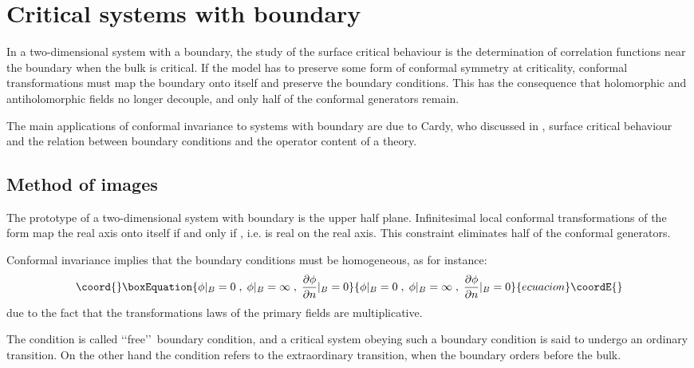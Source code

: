 \documentclass[a4paper,12pt]{report}
\begin{document}
\chapter{Critical systems with boundary}

In a two-dimensional system with a boundary, the study of the surface critical behaviour is the determination of
correlation functions near the boundary when the bulk is critical. If the model has to preserve some form of
conformal symmetry at criticality, conformal transformations must map the boundary onto itself and preserve the
boundary conditions. This has the consequence that holomorphic and antiholomorphic fields no longer decouple, and
only half of the conformal generators remain.

The main applications of conformal invariance to systems with boundary are due to Cardy, who discussed in
\cite{cardy0},\cite{cardy1} surface critical behaviour and the relation between boundary conditions and the
operator content of a theory.

\vspace{1cm}

\section{Method of images}

The prototype of a two-dimensional system with boundary is the upper half plane. Infinitesimal local conformal
transformations of the form \coordHE{} map the real axis onto itself if and only if \coordHE{}, i.e. \myHighlight{$\epsilon$}\coordHE{} is real on the real axis. This constraint eliminates half of the
conformal generators.

Conformal invariance implies that the boundary conditions must be homogeneous, as for instance:
\begin{equation}\coord{}\boxEquation{
\phi|_{B}=0 \; , \;\phi|_{B}=\infty \; , \;\frac{\partial\phi}{\partial n}|_{B}=0
}{
\phi|_{B}=0 \; , \;\phi|_{B}=\infty \; , \;\frac{\partial\phi}{\partial n}|_{B}=0
}{ecuacion}\coordE{}\end{equation}
due to the fact that the transformations laws of the primary fields are multiplicative.

The condition \coordHE{} is called \lq\lq free\rq\rq\, boundary condition, and a critical system obeying such a
boundary condition is said to undergo an ordinary transition. On the other hand the condition \coordHE{}
refers to the extraordinary transition, when the boundary orders before the bulk.
\end{document}

